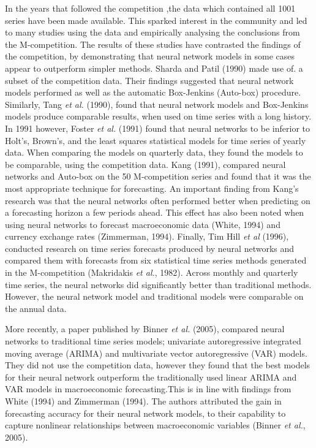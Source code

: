 In the years that followed the competition ,the data which contained all 1001 series have been made available. This sparked interest in the community and led to many studies using the data and empirically analysing the conclusions from the M-competition. The results of these studies have contrasted the findings of the competition, by demonstrating that neural network models in some cases appear to outperform simpler methods.  Sharda and Patil (1990) made use of. a subset of the competition data. Their findings suggested that neural network models performed as well as the automatic Box-Jenkins (Auto-box) procedure. Similarly, Tang \textit{et al.} (1990), found that neural network models and Box-Jenkins models produce comparable results, when used on time series with a long history. In 1991 however, Foster \textit{et al.} (1991)  found that neural networks to be inferior to Holt's, Brown's, and the least squares statistical models for time series of yearly data. When comparing the models on quarterly data, they found the models to be comparable, using the competition data. Kang (1991), compared neural networks and Auto-box on the 50 M-competition series and found that it was the most appropriate technique for forecasting. An important finding from Kang's research was that the neural networks often performed better when predicting on a forecasting horizon a few periods ahead. This effect has also been noted when using neural networks to forecast macroeconomic data (White, 1994) and currency exchange rates (Zimmerman, 1994). Finally, Tim Hill \textit{et al} (1996), conducted research on time series forecasts produced by neural networks and compared them with forecasts from six statistical time series methods generated in the M-competition (Makridakis \textit{et al.}, 1982). Across monthly and quarterly time series, the neural networks did significantly better than traditional methods. However, the neural network model and traditional models were comparable on the annual data. 

More recently, a paper published by Binner \textit{et al.} (2005), compared neural networks to traditional time series models; univariate autoregressive integrated moving average (ARIMA) and multivariate vector autoregressive (VAR) models. They did not use the competition data, however they found that the best models for their neural network outperform the traditionally used linear ARIMA and VAR models in macroeconomic forecasting.This is in line with findings from White (1994) and Zimmerman (1994). The authors attributed the gain in forecasting accuracy for their neural network models, to their capability to capture nonlinear relationships between macroeconomic variables (Binner \textit{et al.}, 2005). 

